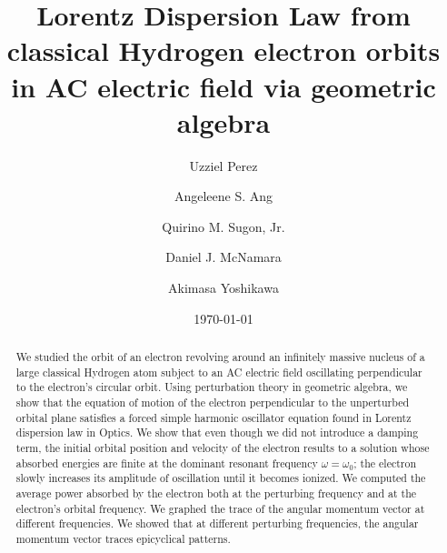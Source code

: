 \documentclass[twocolumn,showpacs,preprintnumbers,amsmath,amssymb]{revtex4}
\begin{document}

\title{Lorentz Dispersion Law from classical Hydrogen electron orbits \\ in AC electric field via geometric algebra}

\author{Uzziel Perez}

\author{Angeleene S. Ang}

\author{Quirino M. Sugon, Jr.}

\author{Daniel J. McNamara}

\author{Akimasa Yoshikawa}


\date{\today}


\begin{abstract}
We studied the orbit of an electron revolving around an infinitely massive nucleus of a large classical Hydrogen atom subject to an AC electric field oscillating perpendicular to the electron's circular orbit. 
Using perturbation theory in geometric algebra, we show that the equation of motion of the electron perpendicular to the unperturbed orbital plane satisfies a forced simple harmonic oscillator equation found in Lorentz dispersion law in Optics. 
We show that even though we did not introduce a damping term, the initial orbital position and velocity of the electron results to a solution whose absorbed energies are finite at the dominant resonant frequency $\omega=\omega_0$; the electron slowly increases its amplitude of oscillation until it becomes ionized. 
We computed the average power absorbed by the electron both at the perturbing frequency and at the electron's orbital frequency. 
We graphed the trace of the angular momentum vector at different frequencies. 
We showed that at different perturbing frequencies, the angular momentum vector traces epicyclical patterns. 
\end{abstract}
\end{document}
